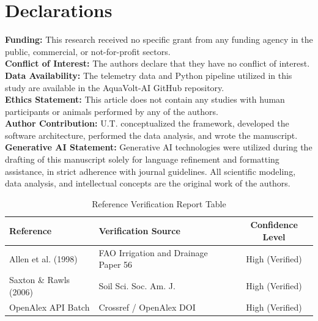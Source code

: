 \documentclass[10pt,twocolumn,letterpaper]{article}
\begin{document}
\backmatter

\section*{Declarations}

\textbf{Funding:} This research received no specific grant from any funding agency in the public, commercial, or not-for-profit sectors.\\
\textbf{Conflict of Interest:} The authors declare that they have no conflict of interest.\\
\textbf{Data Availability:} The telemetry data and Python pipeline utilized in this study are available in the AquaVolt-AI GitHub repository.\\
\textbf{Ethics Statement:} This article does not contain any studies with human participants or animals performed by any of the authors.\\
\textbf{Author Contribution:} U.T. conceptualized the framework, developed the software architecture, performed the data analysis, and wrote the manuscript.\\
\textbf{Generative AI Statement:} Generative AI technologies were utilized during the drafting of this manuscript solely for language refinement and formatting assistance, in strict adherence with journal guidelines. All scientific modeling, data analysis, and intellectual concepts are the original work of the authors.

\begin{table}[h]
\begin{center}
\begin{minipage}{\textwidth}
\caption{Reference Verification Report Table}\label{tab5}
\begin{tabular}{@{}llc@{}}
\toprule
Reference & Verification Source & Confidence Level \\
\midrule
Allen et al. (1998) & FAO Irrigation and Drainage Paper 56 & High (Verified) \\
Saxton \& Rawls (2006) & Soil Sci. Soc. Am. J. & High (Verified) \\
OpenAlex API Batch & Crossref / OpenAlex DOI & High (Verified) \\
\bottomrule
\end{tabular}
\end{minipage}
\end{center}
\end{table}




\end{document}
